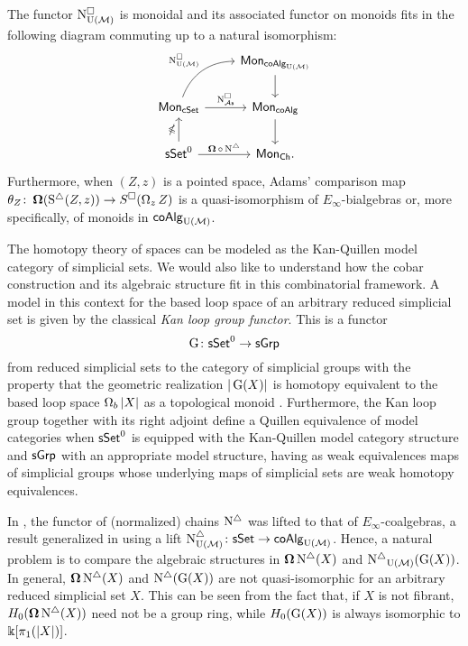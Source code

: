 \begin{theorem} \label{t:1st main thm in the intro}
	The functor $\operatorname{N^{\square}_{{\operatorname{U}(\mathcal{M})}}}$ is monoidal and its associated functor on monoids fits in the following diagram commuting up to a natural isomorphism:
	\[
	\begin{tikzcd}
	& \Mon_{\coAlg_\UM} \arrow[d] \\
	\Mon_{\cSet} \arrow[ru, "\cchainsUM", out=70, in=180] \arrow[r, "\cchainsAS"]
	& \Mon_{\coAlg} \arrow[d] \\
	\sSet^0 \arrow[r, "\cobar \circ \schains"] \arrow[u, "\ccobar"]
	& \Mon_{\Ch}.
	\end{tikzcd}
	\]
	Furthermore, when $(Z, z)$ is a pointed space, Adams' comparison map $\theta_Z \colon \operatorname{\mathbf{\Omega}}(\operatorname{S^{\triangle}}(Z, z)) \to S^{\square}(\operatorname{\Omega}_z Z)$ is a quasi-isomorphism of $E_{\infty}$-bialgebras or, more specifically, of monoids in $\mathsf{coAlg}_{\operatorname{U}(\mathcal{M})}$.
\end{theorem} 
The homotopy theory of spaces can be modeled as the Kan-Quillen model category of simplicial sets.
We would also like to understand how the cobar construction and its algebraic structure fit in this combinatorial framework.
A model in this context for the based loop space of an arbitrary reduced simplicial set is given by the classical \textit{Kan loop group functor}.
This is a functor 
\[
\operatorname{G} \colon \mathsf{sSet}^0 \to \mathsf{sGrp}
\]
from reduced simplicial sets to the category of simplicial groups with the property that the geometric realization $|\operatorname{G}(X)|$ is homotopy equivalent to the based loop space $\operatorname{\Omega}_b|X|$ as a topological monoid \cite{berger1995loops}.
Furthermore, the Kan loop group together with its right adjoint define a Quillen equivalence of model categories when $\mathsf{sSet}^0$ is equipped with the Kan-Quillen model category structure and $\mathsf{sGrp}$ with an appropriate model structure, having as weak equivalences maps of simplicial groups whose underlying maps of simplicial sets are weak homotopy equivalences.

In \cite{mcclure2003multivariable, berger2004combinatorial}, the functor of (normalized) chains $\operatorname{N^{\triangle}}$ was lifted to that of $E_{\infty}$-coalgebras, a result generalized in \cite{medina2020prop1} using a lift $\operatorname{N^{\triangle}_{{\operatorname{U}(\mathcal{M})}}} \colon \mathsf{sSet} \to \mathsf{coAlg}_{{\operatorname{U}(\mathcal{M})}}$.
Hence, a natural problem is to compare the algebraic structures in $\operatorname{\mathbf{\Omega}} \operatorname{N^{\triangle}}(X)$ and $\operatorname{N^{\triangle}}_{{\operatorname{U}(\mathcal{M})}}(\operatorname{G}(X))$.
In general, $\operatorname{\mathbf{\Omega}} \operatorname{N^{\triangle}}(X)$ and $\operatorname{N^{\triangle}}(\operatorname{G}(X))$ are not quasi-isomorphic for an arbitrary reduced simplicial set $X$.
This can be seen from the fact that, if $X$ is not fibrant, $H_0(\operatorname{\mathbf{\Omega}} \operatorname{N^{\triangle}}(X))$ need not be a group ring, while $H_0(\operatorname{G}(X))$ is always isomorphic to $ \Bbbk[\pi_1(|X|)]$.

